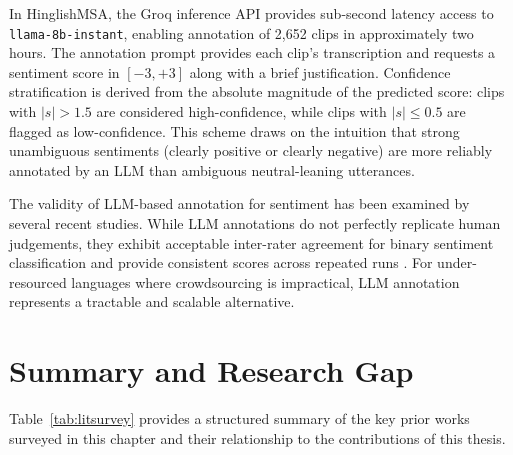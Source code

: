 In HinglishMSA, the Groq inference API provides sub-second latency access to \texttt{llama\allowbreak-8b\allowbreak-instant}, enabling annotation of 2,652 clips in approximately two hours. The annotation prompt provides each clip's transcription and requests a sentiment score in $[-3, +3]$ along with a brief justification. Confidence stratification is derived from the absolute magnitude of the predicted score: clips with $|s| > 1.5$ are considered high-confidence, while clips with $|s| \leq 0.5$ are flagged as low-confidence. This scheme draws on the intuition that strong unambiguous sentiments (clearly positive or clearly negative) are more reliably annotated by an LLM than ambiguous neutral-leaning utterances.

The validity of LLM-based annotation for sentiment has been examined by several recent studies. While LLM annotations do not perfectly replicate human judgements, they exhibit acceptable inter-rater agreement for binary sentiment classification and provide consistent scores across repeated runs \cite{touvron2023llama}. For under-resourced languages where crowdsourcing is impractical, LLM annotation represents a tractable and scalable alternative.

\section{Summary and Research Gap}

Table~\ref{tab:litsurvey} provides a structured summary of the key prior works surveyed in this chapter and their relationship to the contributions of this thesis.


